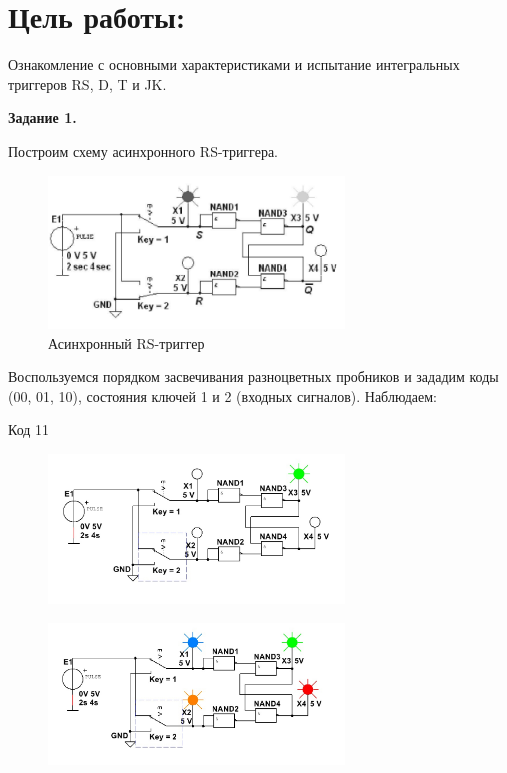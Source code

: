 \documentclass[spec, och, labwork]{shiza}
\begin{document}
\section{Цель работы:}

Ознакомление с основными характеристиками и испытание интегральных триггеров RS, D, T и JK.

\textbf{Задание 1.}

Построим схему асинхронного RS-триггера.

\begin{figure}[H]
    \centering
    \includegraphics[width=0.7\textwidth]{img/image1}
    \caption{Асинхронный RS-триггер}
\end{figure}
        
Воспользуемся порядком засвечивания разноцветных пробников и зададим коды (00, 01, 10), состояния ключей 1 и 2 (входных сигналов). Наблюдаем:

Код 11

\begin{figure}[H]
    \centering
    \includegraphics[width=0.7\textwidth]{img/image2}
    \caption{}
\end{figure}

\begin{figure}[H]
    \centering
    \includegraphics[width=0.7\textwidth]{img/image3}
    \caption{}
\end{figure}
\end{document}
